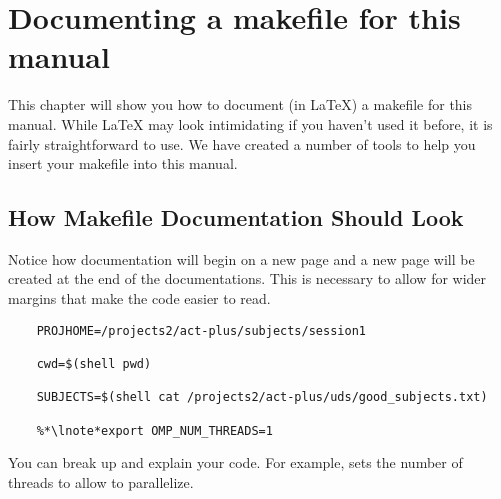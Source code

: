 \chapter{Documenting a makefile for this manual}

This chapter will show you how to document (in \LaTeX) a makefile for this manual. While \LaTeX{} may look intimidating if you haven't used it before, it is fairly straightforward to use. We have created a number of tools to help you insert your makefile into this manual.



\section{How Makefile Documentation Should Look}

Notice how documentation will begin on a new page and a new page will be created at the end of the documentations. This is necessary to allow for wider margins that make the code easier to read.



\begin{lstlisting}
	PROJHOME=/projects2/act-plus/subjects/session1
	
	cwd=$(shell pwd)
	
	SUBJECTS=$(shell cat /projects2/act-plus/uds/good_subjects.txt)
	
	%*\lnote*export OMP_NUM_THREADS=1

\end{lstlisting}

You can break up and explain your code. For example,  sets the number of threads to allow \maken{} to parallelize.


